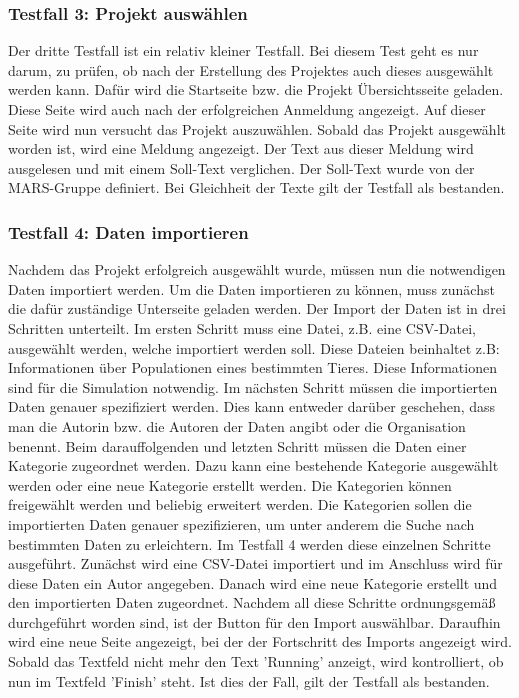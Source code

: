 \documentclass{llncs}
\begin{document}
\subsubsection{Testfall 3: Projekt auswählen}
Der dritte Testfall ist ein relativ kleiner Testfall. Bei diesem Test geht es nur darum, zu prüfen, ob nach der Erstellung des Projektes auch dieses ausgewählt werden kann. Dafür wird die Startseite bzw. die Projekt Übersichtsseite geladen. Diese Seite wird auch nach der erfolgreichen Anmeldung angezeigt. Auf dieser Seite wird nun versucht das Projekt auszuwählen. Sobald das Projekt ausgewählt worden ist, wird eine Meldung angezeigt. Der Text aus dieser Meldung wird ausgelesen und mit einem Soll-Text verglichen. Der Soll-Text wurde von der MARS-Gruppe definiert. Bei Gleichheit der Texte gilt der Testfall als bestanden.

\subsubsection{Testfall 4: Daten importieren}
Nachdem das Projekt erfolgreich ausgewählt wurde, müssen nun die notwendigen Daten importiert werden. Um die Daten importieren zu können, muss zunächst die dafür zuständige Unterseite geladen werden.
Der Import der Daten ist in drei Schritten unterteilt. Im ersten Schritt muss eine Datei, z.B. eine CSV-Datei, ausgewählt werden, welche importiert werden soll. Diese Dateien beinhaltet z.B: Informationen über Populationen eines bestimmten Tieres. Diese Informationen sind für die Simulation notwendig. Im nächsten Schritt müssen die importierten Daten genauer spezifiziert werden. Dies kann entweder darüber geschehen, dass man die Autorin bzw. die Autoren der Daten angibt oder die Organisation benennt. Beim darauffolgenden und letzten Schritt müssen die Daten einer Kategorie zugeordnet werden. Dazu kann eine bestehende Kategorie ausgewählt werden oder eine neue Kategorie erstellt werden. Die Kategorien können freigewählt werden und beliebig erweitert werden. Die Kategorien sollen die importierten Daten genauer spezifizieren, um unter anderem die Suche nach bestimmten Daten zu erleichtern.
Im Testfall 4 werden diese einzelnen Schritte ausgeführt. Zunächst wird eine CSV-Datei importiert und im Anschluss wird für diese Daten ein Autor angegeben. Danach wird eine neue Kategorie erstellt und den importierten Daten zugeordnet. Nachdem all diese Schritte ordnungsgemäß durchgeführt worden sind, ist der Button für den Import auswählbar. Daraufhin wird eine neue Seite angezeigt, bei der der Fortschritt des Imports angezeigt wird. Sobald das Textfeld nicht mehr den Text 'Running' anzeigt, wird kontrolliert, ob nun im Textfeld 'Finish' steht. Ist dies der Fall, gilt der Testfall als bestanden.
\end{document}
